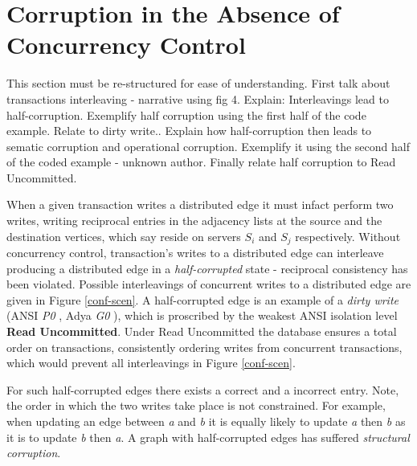 \section{Corruption in the Absence of Concurrency Control}
\label{sec:db-corruption}

This section must be re-structured for ease of understanding.
First talk about transactions interleaving - narrative using fig 4.
Explain: Interleavings lead to half-corruption.
Exemplify half corruption using the first half of the code example.
Relate to dirty write..
Explain how half-corruption then leads to  sematic corruption and operational corruption.
Exemplify it using the second half of the coded example - unknown author.
Finally relate half corruption to Read Uncommitted.





When a given transaction writes a distributed edge it must infact perform two writes, writing reciprocal entries in the adjacency lists at the source and the destination vertices, which say reside on servers $S_i$ and $S_j$ respectively. Without concurrency control, transaction's writes to a distributed edge can interleave producing a distributed edge in a \emph{half-corrupted} state - reciprocal consistency has been violated. Possible interleavings of concurrent writes to a distributed edge are given in Figure \ref{conf-scen}. A half-corrupted edge is an example of a \emph{dirty write} (ANSI \emph{P0} \cite{Berenson1995}, Adya \emph{G0} \cite{Adya2000}), which is proscribed by the weakest ANSI isolation level \textbf{Read Uncommitted}. Under Read Uncommitted the database ensures a total order on transactions, consistently ordering writes from concurrent transactions, which would prevent all interleavings in Figure \ref{conf-scen}.

For such half-corrupted edges there exists a correct and a incorrect entry. Note, the order in which the two writes take place is not constrained. For example, when updating an edge between \emph{a} and \emph{b} it is equally likely to update \emph{a} then \emph{b} as it is to update \emph{b} then \emph{a}. A graph with half-corrupted edges has suffered \emph{structural corruption}.

